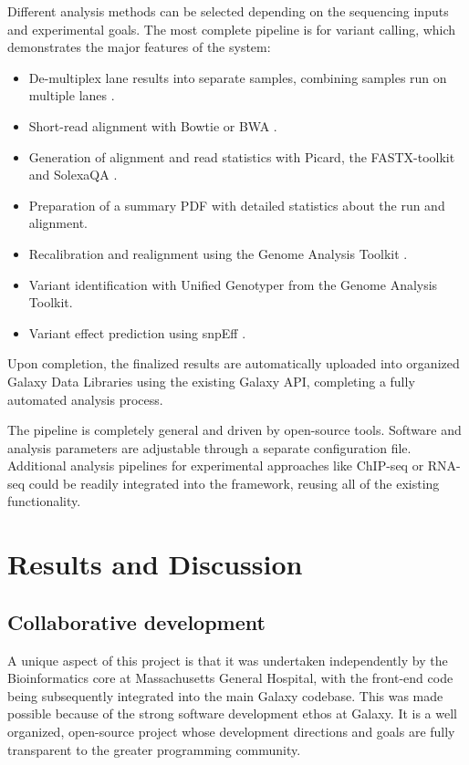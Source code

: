 \documentclass[10pt]{bmc_article}
\newenvironment{bmcformat}{\begin{raggedright}\baselineskip20pt\sloppy\setboolean{publ}{false}}{\end{raggedright}\baselineskip20pt\sloppy}
\begin{document}
\begin{bmcformat}
Different analysis methods can be selected depending on the sequencing
inputs and experimental goals. The most complete pipeline is for
variant calling, which demonstrates the major features of the system:

\begin{itemize}
  \item De-multiplex lane results into separate samples, combining
    samples run on multiple lanes \cite{cock_biopython:_2009}.
  \item Short-read alignment with Bowtie or BWA
    \cite{langmead_ultrafast_2009,li_fast_2009}.
  \item Generation of alignment and read statistics with Picard, the
    FASTX-toolkit and SolexaQA
    \cite{_picard_????,_fastx-toolkit_????,cox_solexaqa:_2010}.
  \item Preparation of a summary PDF with detailed statistics
    about the run and alignment.
  \item Recalibration and realignment using the Genome Analysis
    Toolkit
    \cite{mckenna_genome_2010,_pysam_????,gautier_intuitive_2010}.
  \item Variant identification with Unified Genotyper from the Genome
    Analysis Toolkit.
  \item Variant effect prediction using snpEff \cite{_snpeff_????}.
\end{itemize}

Upon completion, the finalized results are automatically uploaded into
organized Galaxy Data Libraries using the existing Galaxy API,
completing a fully automated analysis process.

The pipeline is completely general and driven by open-source
tools. Software and analysis parameters are adjustable through a
separate configuration file. Additional analysis pipelines for
experimental approaches like ChIP-seq or RNA-seq could be readily
integrated into the framework, reusing all of the existing
functionality.

\section*{Results and Discussion}

\subsection*{Collaborative development}

A unique aspect of this project is that it was undertaken
independently by the Bioinformatics core at Massachusetts General
Hospital, with the front-end code being subsequently integrated
into the main Galaxy codebase. This was made possible because of the
strong software development ethos at Galaxy. It is a well organized,
open-source project whose development directions and goals are fully
transparent to the greater programming community.


\end{bmcformat}
\end{document}

